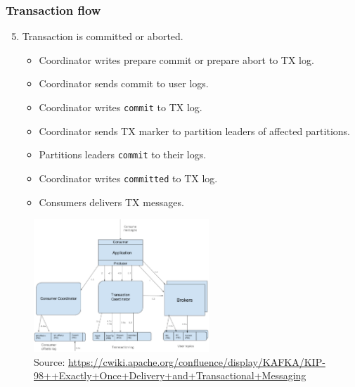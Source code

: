 \documentclass[10pt,utf8]{beamer}
\begin{document}
\begin{frame}
    \frametitle{Transaction flow}
    \begin{enumerate}
        \setcounter{enumi}{4}
        \item Transaction is committed or aborted.
        \begin{itemize}
          \item Coordinator writes prepare commit or prepare abort to TX log.
          \item Coordinator sends commit to user logs.
          \item Coordinator writes \texttt{commit} to TX log.
          \item Coordinator sends TX marker to partition leaders of affected partitions.
          \item Partitions leaders \texttt{commit} to their logs.
          \item Coordinator writes \texttt{committed} to TX log.
          \item Consumers delivers TX messages.
        \end{itemize}
    \end{enumerate}
    \begin{figure}
        \centering
        \includegraphics[height=5cm]{./img/tx_flow.eps}
        \caption{\tiny{Source: \url{https://cwiki.apache.org/confluence/display/KAFKA/KIP-98++Exactly+Once+Delivery+and+Transactional+Messaging}}}
    \end{figure}
\end{frame}
\end{document}
